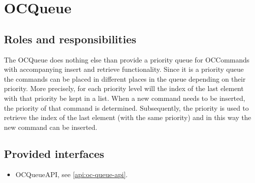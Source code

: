 \section{OCQueue}
\label{element:oc-queue}

\subsection{Roles and responsibilities}

\npar The OCQueue does nothing else than provide a priority queue for
OCCommands with accompanying insert and retrieve functionality. Since
it is a priority queue the commands can be placed in different places in the
queue depending on their priority. More precisely, for each priority level will
the index of the last element with that priority be kept in a list. When a new
command needs to be inserted, the priority of that command is determined.
Subsequently, the priority is used to retrieve the index of the last element
(with the same priority) and in this way the new command can be inserted.

\subsection{Provided interfaces}

\begin{itemize}
  \item OCQueueAPI, see \ref{api:oc-queue-api}.
\end{itemize}